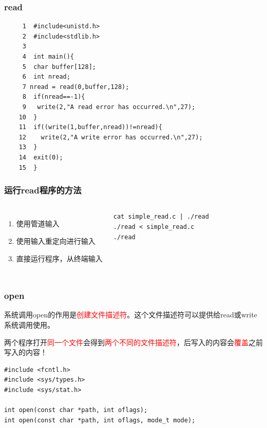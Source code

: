 \documentclass{beamer}
\begin{document}
\begin{frame}[fragile]
\frametitle{read}
\begin{example}[read系统调用的使用实例]
\begin{verbatim}
     1  #include<unistd.h>
     2  #include<stdlib.h>
     3
     4  int main(){
     5  char buffer[128];
     6  int nread;
     7 nread = read(0,buffer,128);
     8  if(nread==-1){
     9   write(2,"A read error has occurred.\n",27);
    10  }
    11  if((write(1,buffer,nread))!=nread){
    12    write(2,"A write error has occurred.\n",27);
    13  }
    14  exit(0);
    15  }
\end{verbatim}
\end{example}

\end{frame}


\begin{frame}[fragile]
\frametitle{运行read程序的方法}
\begin{columns}
\begin{enumerate}
\item
使用管道输入
\item
使用输入重定向进行输入
\item
直接运行程序，从终端输入
\end{enumerate}
\begin{lstlisting}
cat simple_read.c | ./read
./read < simple_read.c
./read
\end{lstlisting}
\end{columns}
\end{frame}

\begin{frame}[fragile]
\frametitle{open}
系统调用open的作用是\textcolor{red}{创建文件描述符}。这个文件描述符可以提供给read或write系统调用使用。

两个程序打开\textcolor{red}{同一个文件}会得到\textcolor{red}{两个不同的文件描述符}，后写入的内容会\textcolor{red}{覆盖}之前写入的内容！
\begin{example}[open系统调用的原型]
\begin{verbatim}
#include <fcntl.h>
#include <sys/types.h>
#include <sys/stat.h>

int open(const char *path, int oflags);
int open(const char *path, int oflags, mode_t mode);
\end{verbatim}
\end{example}

\end{frame}
\end{document}
